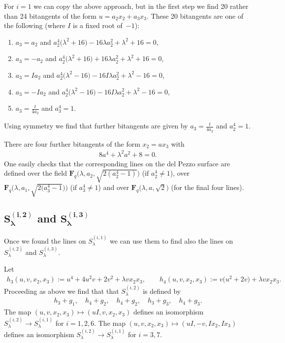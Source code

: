 \documentclass[pdftex]{sigma}
\numberwithin{equation}{section}
\begin{document}
For $i=1$ we can copy the above approach, but in the f\/irst step we f\/ind 20 rather than 24 bitangents of the form $u=a_2x_2+a_3x_3$. These 20 bitangents are one of the following (where $I$ is a f\/ixed root of~$-1$):
\begin{enumerate}\itemsep=0pt
\item[1)] $a_3=a_2$ and $a_2^4 \big(\lambda^2+16\big)-16\lambda a_2^2+\lambda^2 +16=0$,
\item[2)] $a_3=-a_2$ and $a_2^4 \big(\lambda^2+16\big)+16\lambda a_2^2+\lambda^2 +16=0$,
\item[3)] $ a_3=Ia_2$ and $a_2^4\big(\lambda^2-16\big)-16 I \lambda a_2^2+\lambda^2-16=0$,
\item[4)] $ a_3=-Ia_2$ and $a_2^4\big(\lambda^2-16\big)-16 I \lambda a_2^2+\lambda^2-16=0$,
\item[5)] $ a_3=\frac{t}{4a_2}$ and $a_3^4=1$.
\end{enumerate}
Using symmetry we f\/ind that further bitangents are given by $ a_3=\frac{t}{4a_2}$ and $a_2^4=1$.

There are four further bitangents of the form $x_2=ax_3$ with
\begin{gather*} 8a^4+\lambda^2 a^2+8=0.\end{gather*}
One easily checks that the corresponding lines on the del Pezzo surface are def\/ined over the f\/ield $\mathbf{F}_q\big(\lambda, a_2,\sqrt{2(a_2^4-1)}\big)$ (if $a_2^4\neq 1$), over $\mathbf{F}_q\big(\lambda, a_1,\sqrt{2(a_3^4-1})\big)$ (if $a_3^4\neq 1$) and over $\mathbf{F}_q\big(\lambda, a,\sqrt{2}\big)$ (for the f\/inal four lines).

\subsection[$S^{(i,2)}_{\lambda}$ and $S^{(i,3)}_{\lambda}$]{$\boldsymbol{S^{(i,2)}_{\lambda}}$ and $\boldsymbol{S^{(i,3)}_{\lambda}}$}
Once we found the lines on $S^{(i,1)}_\lambda$ we can use them to f\/ind also the lines on $S^{(i,2)}_\lambda$ and $S^{(i,3)}_\lambda$.

Let
\begin{gather*} h_3(u,v,x_2,x_3):=u^4+4u^2v+2v^2+\lambda vx_2x_3, \qquad h_4(u,v,x_2,x_3):=v\big(u^2+2v\big)+\lambda vx_2x_3.\end{gather*}
Proceeding as above we f\/ind that that $S^{(i,2)}_{\lambda}$ is def\/ined by
\begin{gather*} h_3+g_1,\quad h_4+g_2,\quad h_4+g_2,\quad h_3+g_3,\quad h_4+g_3.\end{gather*}
The map $(u,v,x_2,x_3)\mapsto (uI,v,x_2,x_3)$ def\/ines an isomorphism $S^{(i,2)}_{\lambda} \to S^{(i,1)}_{\lambda}$ for $i=1,2,6$. The map $(u,v,x_2,x_3)\mapsto (uI,-v,Ix_2,Ix_3)$ def\/ines an isomorphism $S^{(i,2)}_{\lambda} \to S^{(i,1)}_{\lambda}$ for $i=3,7$.
\end{document}
